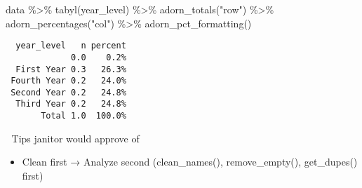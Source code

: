 \documentclass[
  letterpaper,
  DIV=11,
  numbers=noendperiod]{scrartcl}
\newenvironment{Shaded}{\begin{snugshade}}{\end{snugshade}}
\newcommand{\FunctionTok}[1]{\textcolor[rgb]{0.28,0.35,0.67}{#1}}
\newcommand{\NormalTok}[1]{\textcolor[rgb]{0.00,0.23,0.31}{#1}}
\newcommand{\SpecialCharTok}[1]{\textcolor[rgb]{0.37,0.37,0.37}{#1}}
\newcommand{\StringTok}[1]{\textcolor[rgb]{0.13,0.47,0.30}{#1}}
\providecommand{\tightlist}{%
  \setlength{\itemsep}{0pt}\setlength{\parskip}{0pt}}\usepackage{longtable,booktabs,array}
\begin{document}
\begin{Shaded}
\begin{Highlighting}[]
\NormalTok{data }\SpecialCharTok{\%\textgreater{}\%} 
  \FunctionTok{tabyl}\NormalTok{(year\_level) }\SpecialCharTok{\%\textgreater{}\%} 
  \FunctionTok{adorn\_totals}\NormalTok{(}\StringTok{"row"}\NormalTok{) }\SpecialCharTok{\%\textgreater{}\%}  
  \FunctionTok{adorn\_percentages}\NormalTok{(}\StringTok{"col"}\NormalTok{) }\SpecialCharTok{\%\textgreater{}\%}  
  \FunctionTok{adorn\_pct\_formatting}\NormalTok{()}
\end{Highlighting}
\end{Shaded}

\begin{verbatim}
  year_level   n percent
             0.0    0.2%
  First Year 0.3   26.3%
 Fourth Year 0.2   24.0%
 Second Year 0.2   24.8%
  Third Year 0.2   24.8%
       Total 1.0  100.0%
\end{verbatim}

🧠 Tips janitor would approve of

\begin{itemize}
\tightlist
\item
  Clean first → Analyze second (clean\_names(), remove\_empty(),
  get\_dupes() first)
\end{itemize}
\end{document}
